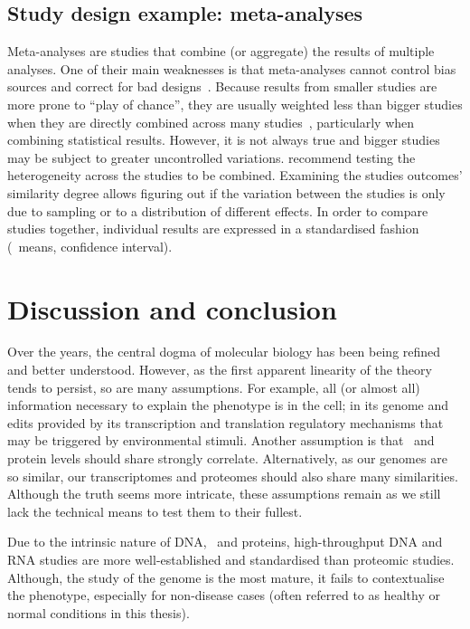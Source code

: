 \subsection{Study design example: meta-analyses}

Meta-analyses are studies that combine (or aggregate) the results of multiple analyses.
One of their main weaknesses is
that meta-analyses cannot control bias sources
and correct for bad designs~.
Because results from smaller studies are more prone to \enquote{play of chance},
they are usually weighted less than bigger studies
when they are directly combined across many studies~,
particularly when combining statistical results.
However, it is not always true and bigger studies may be subject
to greater uncontrolled variations.
\citet{Egger1997-ny} recommend testing the heterogeneity across the studies
to be combined.
Examining the studies outcomes' similarity degree allows figuring out
if the variation between the studies is only due to sampling or
to a distribution of different effects.
In order to compare studies together,
individual results are expressed in a standardised fashion
(\eg\ means, confidence interval).\mybr\


\section{Discussion and conclusion}\label{sec:bgConcl}

Over the years, the central dogma of molecular biology
has been being refined and better understood.
However, as the first apparent linearity of the theory tends to persist,
so are many assumptions.
For example,
all (or almost all) information necessary to explain the \gls{phenotype} is in the cell;
in its genome and edits provided by
its transcription and translation regulatory mechanisms
that may be triggered by environmental stimuli.
Another assumption is that
\mRNA\ and protein levels should share strongly correlate.
Alternatively, as our genomes are so similar,
our transcriptomes and proteomes should also share many similarities.
Although the truth seems more intricate,
these assumptions remain
as we still lack the technical means to test them to their fullest.\mybr\

Due to the intrinsic nature of \gls{DNA}, \mRNAs\ and proteins,
high-throughput \gls{DNA} and \gls{RNA} studies are more well-established
and standardised than proteomic studies.
Although, the study of the genome is the most mature,
it fails to contextualise the phenotype,
especially for non-disease cases
(often referred to as healthy or normal conditions in this thesis).\mybr\

